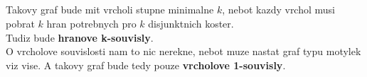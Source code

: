 \documentclass[a4paper]{article}
\begin{document}
\subsection{}
Takovy graf bude mit vrcholi stupne minimalne $k$, nebot kazdy vrchol musi
pobrat $k$ hran potrebnych pro $k$ disjunktnich koster.\\
Tudiz bude \textbf{hranove k-souvisly}.\\
O vrcholove souvislosti nam to nic nerekne, nebot muze nastat graf typu motylek
viz vise. A takovy graf bude tedy pouze \textbf{vrcholove 1-souvisly}.
\end{document}

